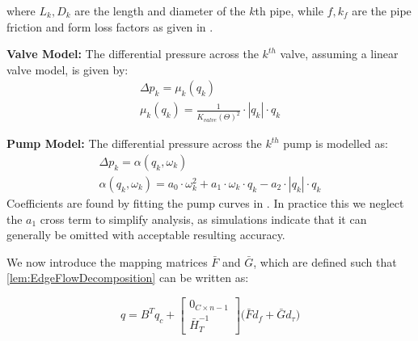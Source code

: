 where $L_k, D_k$ are the length and diameter of the $k$th pipe, while $f,k_f$ are the pipe friction and form loss factors as given in \cite{Swamee2008}.

\textbf{Valve Model:}
The differential pressure across the $ k^{th} $ valve, assuming a linear valve model, is given by:
\begin{equation}\label{eq:ValveModel}
	\begin{gathered}
		\Delta p_{k} = \mu_k(q_k) \\ 
		\mu_k(q_k) = \frac{1}{K_{valve}(\Theta)^2} \cdot |q_k|\cdot q_k
	\end{gathered}
\end{equation}

\textbf{Pump Model:}
The differential pressure across the $ k^{th} $ pump is modelled as:
\begin{equation}\label{eq:PumpPressure}
	\begin{gathered}
		\Delta p_{k} =   \alpha(q_k,\omega_k) \\
		\alpha(q_k,\omega_k) = a_0\cdot \omega_k^2 +  a_1\cdot \omega_k \cdot q_k -a_2\cdot |q_k|\cdot q_k
	\end{gathered}
\end{equation}
Coefficients are found by fitting the pump curves in \cite{GrundfosDatablad}. In practice this we neglect the $ a_1 $ cross term to simplify analysis, as simulations indicate that it can generally be omitted with acceptable resulting accuracy.



We now introduce the mapping matrices $\bar{F}$ and $\bar{G}$, which are defined such that \cref{lem:EdgeFlowDecomposition} can be written as:

\begin{equation}\label{eq:FlowDecomposition}
		q = B^T q_c +
	\begin{bmatrix}
		0_{C \times n-1} \\ \bar{H}_T^{-1} 
	\end{bmatrix}
	\Big(\bar{F}d_f + \bar{G}d_\tau \Big)
\end{equation}

